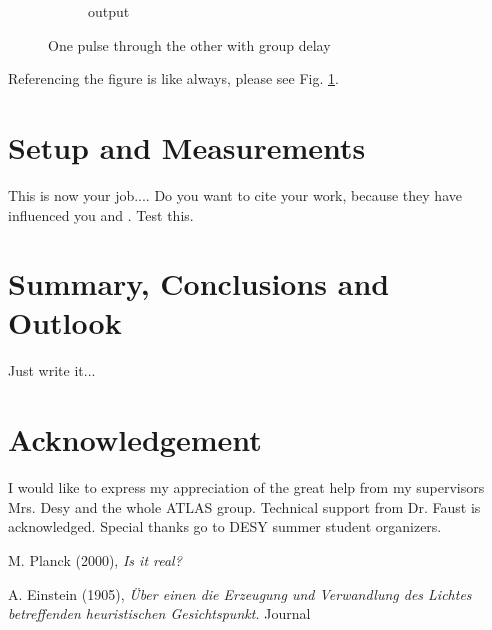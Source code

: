 \documentclass[12pt,oneside,notitlepage,abstracton,a4paper]{scrartcl}
\begin{document}
\begin{figure}[h]
\begin{subfigure}[t]{0.4\textwidth}
	\caption{output}
\end{subfigure}
\caption[Short title:group delay]{One pulse through the other with group delay}
\label{fig:example}
\end{figure}
Referencing the figure is like always, please see Fig. \ref{fig:example}.


\newpage %

\section{Setup and Measurements}
This is now your job....
Do you want to cite your work, because they have influenced you \cite{einstein1905} and \cite{planck2000}.
Test this.







\section{Summary, Conclusions and Outlook}
Just write it...

\clearpage
\section*{Acknowledgement}
I would like to express my appreciation of the great help from my supervisors Mrs. Desy and the whole ATLAS group. Technical support from Dr. Faust is acknowledged. Special thanks go to DESY summer student organizers.

\begin{thebibliography}{99}

M. Planck (2000), 
{\em Is it real?}

A. Einstein (1905), 
{\em \"Uber einen die Erzeugung und Verwandlung des Lichtes betreffenden heuristischen Gesichtspunkt.} Journal  



\end{thebibliography}
\end{document}
